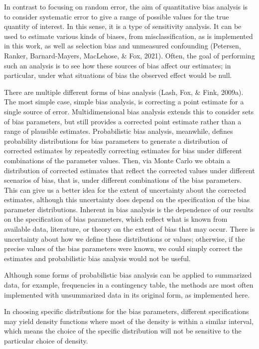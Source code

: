 \documentclass[12pt,twoside]{smiththesis}
\begin{document}
In contrast to focusing on random error, the aim of quantitative bias analysis is to consider systematic error to give a range of possible values for the true quantity of interest. In this sense, it is a type of sensitivity analysis. It can be used to estimate various kinds of biases, from misclassification, as is implemented in this work, as well as selection bias and unmeasured confounding (Petersen, Ranker, Barnard-Mayers, MacLehose, \& Fox, 2021). Often, the goal of performing such an analysis is to see how these sources of bias affect our estimates; in particular, under what situations of bias the observed effect would be null.

There are multiple different forms of bias analysis (Lash, Fox, \& Fink, 2009a). The most simple case, simple bias analysis, is correcting a point estimate for a single source of error. Multidimensional bias analysis extends this to consider sets of bias parameters, but still provides a corrected point estimate rather than a range of plausible estimates. Probabilistic bias analysis, meanwhile, defines probability distributions for bias parameters to generate a distribution of corrected estimates by repeatedly correcting estimates for bias under different combinations of the parameter values. Then, via Monte Carlo we obtain a distribution of corrected estimates that reflect the corrected values under different scenarios of bias, that is, under different combinations of the bias parameters. This can give us a better idea for the extent of uncertainty about the corrected estimates, although this uncertainty does depend on the specification of the bias parameter distributions. Inherent in bias analysis is the dependence of our results on the specification of bias parameters, which reflect what is known from available data, literature, or theory on the extent of bias that may occur. There is uncertainty about how we define these distributions or values; otherwise, if the precise values of the bias parameters were known, we could simply correct the estimates and probabilistic bias analysis would not be useful.

Although some forms of probabilistic bias analysis can be applied to summarized data, for example, frequencies in a contingency table, the methods are most often implemented with unsummarized data in its original form, as implemented here.

In choosing specific distributions for the bias parameters, different specifications may yield density functions where most of the density is within a similar interval, which means the choice of the specific distribution will not be sensitive to the particular choice of density.
\end{document}
